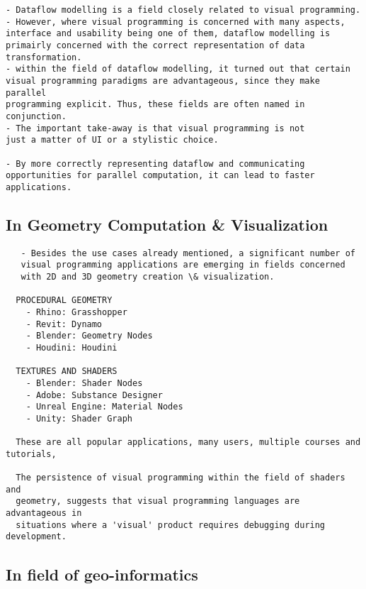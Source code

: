 \begin{lstlisting}
- Dataflow modelling is a field closely related to visual programming.
- However, where visual programming is concerned with many aspects, 
interface and usability being one of them, dataflow modelling is 
primairly concerned with the correct representation of data transformation.   
- within the field of dataflow modelling, it turned out that certain 
visual programming paradigms are advantageous, since they make parallel 
programming explicit. Thus, these fields are often named in conjunction. 
- The important take-away is that visual programming is not 
just a matter of UI or a stylistic choice.

- By more correctly representing dataflow and communicating 
opportunities for parallel computation, it can lead to faster applications.
\end{lstlisting}


\subsection{ In Geometry Computation \& Visualization }
\begin{lstlisting} 
   - Besides the use cases already mentioned, a significant number of 
   visual programming applications are emerging in fields concerned 
   with 2D and 3D geometry creation \& visualization. 

  PROCEDURAL GEOMETRY 
    - Rhino: Grasshopper
    - Revit: Dynamo  
    - Blender: Geometry Nodes
    - Houdini: Houdini
  
  TEXTURES AND SHADERS
    - Blender: Shader Nodes
    - Adobe: Substance Designer
    - Unreal Engine: Material Nodes
    - Unity: Shader Graph

  These are all popular applications, many users, multiple courses and tutorials, 

  The persistence of visual programming within the field of shaders and
  geometry, suggests that visual programming languages are advantageous in
  situations where a 'visual' product requires debugging during development. 
\end{lstlisting}



\subsection{ In field of geo-informatics }

